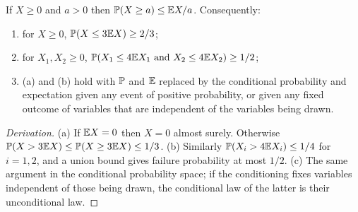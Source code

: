 \begin{citedresult}\label{s1:citMarkov}
If $X\ge0$ and $a>0$ then $\mathbb{P}(X\ge a)\le\mathbb{E} X/a$. Consequently:
\begin{enumerate}
\item[(a)] for $X\ge0$, $\mathbb{P}(X\le3\mathbb{E} X)\ge2/3$;
\item[(b)] for $X_1,X_2\ge0$, $\mathbb{P}(X_1\le4\mathbb{E} X_1\text{ and }X_2\le4\mathbb{E} X_2)\ge
1/2$;
\item[(c)] (a) and (b) hold with $\mathbb{P}$ and $\mathbb{E}$ replaced by the conditional
probability and expectation given any event of positive probability, or given
any fixed outcome of variables that are independent of the variables being
drawn.
\end{enumerate}
\end{citedresult}
\begin{proof}[Derivation]
(a) If $\mathbb{E} X=0$ then $X=0$ almost surely. Otherwise
$\mathbb{P}(X>3\mathbb{E} X)\le\mathbb{P}(X\ge3\mathbb{E} X)\le1/3$.
(b) Similarly $\mathbb{P}(X_i>4\mathbb{E} X_i)\le1/4$ for $i=1,2$, and a union bound gives
failure probability at most $1/2$.
(c) The same argument in the conditional probability space; if the conditioning
fixes variables independent of those being drawn, the conditional law of the
latter is their unconditional law.
\end{proof}


